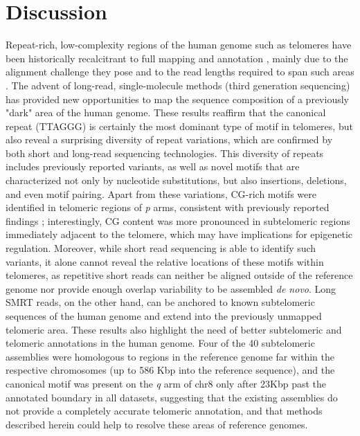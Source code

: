 \documentclass{article}
\begin{document}
\section*{Discussion} 
Repeat-rich, low-complexity regions of the human genome such as telomeres have been historically recalcitrant to full mapping and annotation \cite{miga2015}, mainly due to the alignment challenge they pose and to the read lengths required to span such areas \cite{ngslowcomplexity}.
The advent of long-read, single-molecule methods (third generation sequencing) has provided new opportunities to map the sequence composition of a previously "dark" area of the human genome.
These results reaffirm that the canonical repeat (TTAGGG) is certainly the most dominant type of motif in telomeres, but also reveal a surprising diversity of repeat variations, which are confirmed by both short and long-read sequencing technologies.
This diversity of repeats includes previously reported variants, as well as novel motifs that are characterized not only by nucleotide substitutions, but also insertions, deletions, and even motif pairing.
Apart from these variations, CG-rich motifs were identified in telomeric regions of \textit{p} arms, consistent with previously reported findings \cite{cpg}; interestingly, CG content was more pronounced in subtelomeric regions immediately adjacent to the telomere, which may have implications for epigenetic regulation.
Moreover, while short read sequencing is able to identify such variants, it alone cannot reveal the relative locations of these motifs within telomeres, as repetitive short reads can neither be aligned outside of the reference genome nor provide enough overlap variability to be assembled \textit{de novo}.
Long SMRT reads, on the other hand, can be anchored to known subtelomeric sequences of the human genome and extend into the previously unmapped telomeric area.
These results also highlight the need of better subtelomeric and telomeric annotations in the human genome.
Four of the 40 subtelomeric assemblies \cite{riethman2014} were homologous to regions in the reference genome far within the respective chromosomes (up to 586 Kbp into the reference sequence), and the canonical motif was present on the \textit{q} arm of chr8 only after 2\textendash{}3Kbp past the annotated boundary in all datasets, suggesting that the existing assemblies do not provide a completely accurate telomeric annotation, and that methods described herein could help to resolve these areas of reference genomes.
\\~\\
\end{document}
